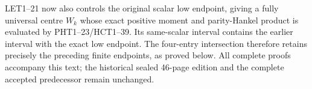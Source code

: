 LET1--21 now also controls the original scalar low endpoint,
giving a fully universal centre $W_k$ whose exact positive
moment and parity-Hankel product is evaluated by PHT1--23/HCT1--39.
Its same-scalar interval contains the earlier interval with
the exact low endpoint. The four-entry intersection therefore
retains precisely the preceding finite endpoints, as proved below.
All complete proofs accompany this text; the historical sealed
46-page edition and the complete accepted predecessor remain unchanged.